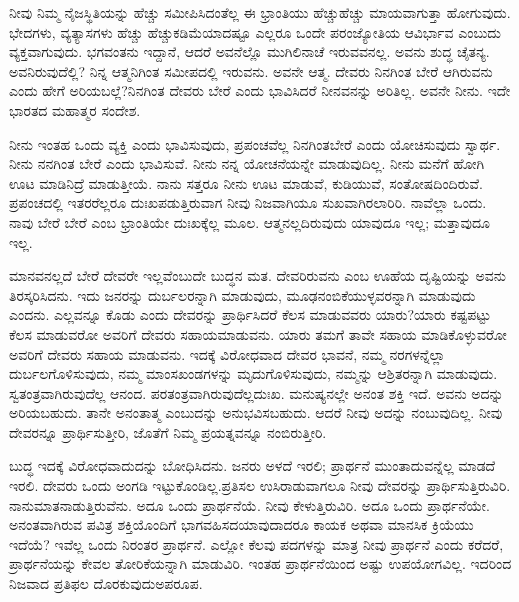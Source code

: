 \vskip 0.1cm

ನೀವು ನಿಮ್ಮ ನೈಜಸ್ಥಿತಿಯನ್ನು ಹೆಚ್ಚು ಸಮೀಪಿಸಿದಂತೆಲ್ಲ ಈ ಭ್ರಾಂತಿಯು ಹೆಚ್ಚು\break ಹೆಚ್ಚು ಮಾಯವಾಗುತ್ತಾ ಹೋಗುವುದು. ಭೇದಗಳು, ವ್ಯತ್ಯಾಸಗಳು ಹೆಚ್ಚು ಹೆಚ್ಚು\break ಕಡಿಮೆಯಾದಷ್ಟೂ ಎಲ್ಲರೂ ಒಂದೇ ಪರಂಜ್ಯೋತಿಯ ಆವಿರ್ಭಾವ ಎಂಬುದು ವ್ಯಕ್ತವಾಗುವುದು. ಭಗವಂತನು ಇದ್ದಾನೆ, ಆದರೆ ಅವನೆಲ್ಲೊ ಮುಗಿಲಿನಾಚೆ ಇರುವವನಲ್ಲ. ಅವನು ಶುದ್ಧ ಚೈತನ್ಯ. ಅವನಿರುವುದೆಲ್ಲಿ? ನಿನ್ನ ಆತ್ಮನಿಗಿಂತ ಸಮೀಪದಲ್ಲಿ ಇರುವನು. ಅವನೇ ಆತ್ಮ. ದೇವರು ನಿನಗಿಂತ ಬೇರೆ ಆಗಿರುವನು ಎಂದು ಹೇಗೆ ಅರಿಯಬಲ್ಲೆ?\break ನಿನಗಿಂತ ದೇವರು ಬೇರೆ ಎಂದು ಭಾವಿಸಿದರೆ ನೀನವನನ್ನು ಅರಿತಿಲ್ಲ. ಅವನೇ ನೀನು. ಇದೇ ಭಾರತದ ಮಹಾತ್ಮರ ಸಂದೇಶ.

\vskip 0.1cm

ನೀನು ಇಂತಹ ಒಂದು ವ್ಯಕ್ತಿ ಎಂದು ಭಾವಿಸುವುದು, ಪ್ರಪಂಚವೆಲ್ಲ ನಿನಗಿಂತ\break ಬೇರೆ ಎಂದು ಯೋಚಿಸುವುದು ಸ್ವಾರ್ಥ. ನೀನು ನನಗಿಂತ ಬೇರೆ ಎಂದು ಭಾವಿಸುವೆ. ನೀನು ನನ್ನ ಯೋಚನೆಯನ್ನೇ ಮಾಡುವುದಿಲ್ಲ. ನೀನು ಮನೆಗೆ ಹೋಗಿ ಊಟ ಮಾಡಿ\break ನಿದ್ರೆ ಮಾಡುತ್ತೀಯೆ. ನಾನು ಸತ್ತರೂ ನೀನು ಊಟ ಮಾಡುವೆ, ಕುಡಿಯುವೆ, ಸಂತೋಷದಿಂದಿರುವೆ. ಪ್ರಪಂಚದಲ್ಲಿ ಇತರರೆಲ್ಲರೂ ದುಃಖಪಡುತ್ತಿರುವಾಗ ನೀವು ನಿಜವಾಗಿಯೂ ಸುಖವಾಗಿರಲಾರಿರಿ. ನಾವೆಲ್ಲಾ ಒಂದು. ನಾವು ಬೇರೆ ಬೇರೆ ಎಂಬ ಭ್ರಾಂತಿಯೇ ದುಃಖಕ್ಕೆಲ್ಲ ಮೂಲ. ಆತ್ಮನಲ್ಲದಿರುವುದು ಯಾವುದೂ ಇಲ್ಲ; ಮತ್ತಾವುದೂ ಇಲ್ಲ.

\vskip 0.1cm

ಮಾನವನಲ್ಲದೆ ಬೇರೆ ದೇವರೇ ಇಲ್ಲವೆಂಬುದೇ ಬುದ್ಧನ ಮತ. ದೇವರಿರುವನು ಎಂಬ ಊಹೆಯ ದೃಷ್ಟಿಯನ್ನು ಅವನು ತಿರಸ್ಕರಿಸಿದನು. ಇದು ಜನರನ್ನು ದುರ್ಬಲರನ್ನಾಗಿ ಮಾಡುವುದು, ಮೂಢನಂಬಿಕೆಯುಳ್ಳವರನ್ನಾಗಿ ಮಾಡುವುದು ಎಂದನು. ಎಲ್ಲವನ್ನೂ ಕೊಡು ಎಂದು ದೇವರನ್ನು ಪ್ರಾರ್ಥಿಸಿದರೆ ಕೆಲಸ ಮಾಡುವವರು ಯಾರು?\break ಯಾರು ಕಷ್ಟಪಟ್ಟು ಕೆಲಸ ಮಾಡುವರೋ ಅವರಿಗೆ ದೇವರು ಸಹಾಯಮಾಡುವನು. ಯಾರು ತಮಗೆ ತಾವೇ ಸಹಾಯ ಮಾಡಿಕೊಳ್ಳುವರೋ ಅವರಿಗೆ ದೇವರು ಸಹಾಯ ಮಾಡುವನು. ಇದಕ್ಕೆ ವಿರೋಧವಾದ ದೇವರ ಭಾವನೆ, ನಮ್ಮ ನರಗಳನ್ನೆಲ್ಲಾ ದುರ್ಬಲಗೊಳಿಸುವುದು, ನಮ್ಮ ಮಾಂಸಖಂಡಗಳನ್ನು ಮೃದುಗೊಳಿಸುವುದು, ನಮ್ಮನ್ನು ಆಶ್ರಿತರನ್ನಾಗಿ ಮಾಡುವುದು. ಸ್ವತಂತ್ರವಾಗಿರುವುದೆಲ್ಲ ಆನಂದ. ಪರತಂತ್ರವಾಗಿರುವುದೆಲ್ಲ\break ದುಃಖ. ಮನುಷ್ಯನಲ್ಲೇ ಅನಂತ ಶಕ್ತಿ ಇದೆ. ಅವನು ಅದನ್ನು ಅರಿಯಬಹುದು. ತಾನೇ ಅನಂತಾತ್ಮ ಎಂಬುದನ್ನು ಅನುಭವಿಸಬಹುದು. ಆದರೆ ನೀವು ಅದನ್ನು ನಂಬುವುದಿಲ್ಲ. ನೀವು ದೇವರನ್ನೂ ಪ್ರಾರ್ಥಿಸುತ್ತೀರಿ, ಜೊತೆಗೆ ನಿಮ್ಮ ಪ್ರಯತ್ನವನ್ನೂ ನಂಬಿರುತ್ತೀರಿ.

\vskip 0.1cm

ಬುದ್ಧ ಇದಕ್ಕೆ ವಿರೋಧವಾದುದನ್ನು ಬೋಧಿಸಿದನು. ಜನರು ಅಳದೆ ಇರಲಿ; ಪ್ರಾರ್ಥನೆ ಮುಂತಾದುವನ್ನೆಲ್ಲ ಮಾಡದೆ ಇರಲಿ. ದೇವರು ಒಂದು ಅಂಗಡಿ ಇಟ್ಟುಕೊಂಡಿಲ್ಲ.\break ಪ್ರತಿಸಲ ಉಸಿರಾಡುವಾಗಲೂ ನೀವು ದೇವರನ್ನು ಪ್ರಾರ್ಥಿಸುತ್ತಿರುವಿರಿ. ನಾನು\break ಮಾತನಾಡುತ್ತಿರುವೆನು. ಅದೂ ಒಂದು ಪ್ರಾರ್ಥನೆಯೆ. ನೀವು ಕೇಳುತ್ತಿರುವಿರಿ. ಅದೂ ಒಂದು ಪ್ರಾರ್ಥನೆಯೇ. ಅನಂತವಾಗಿರುವ ಪವಿತ್ರ ಶಕ್ತಿಯೊಂದಿಗೆ ಭಾಗವಹಿಸದ\break ಯಾವುದಾದರೂ ಕಾಯಕ ಅಥವಾ ಮಾನಸಿಕ ಕ್ರಿಯೆಯು ಇದೆಯೆ? ಇವೆಲ್ಲ ಒಂದು ನಿರಂತರ ಪ್ರಾರ್ಥನೆ. ಎಲ್ಲೋ ಕೆಲವು ಪದಗಳನ್ನು ಮಾತ್ರ ನೀವು ಪ್ರಾರ್ಥನೆ ಎಂದು ಕರೆದರೆ, ಪ್ರಾರ್ಥನೆಯನ್ನು ಕೇವಲ ತೋರಿಕೆಯನ್ನಾಗಿ ಮಾಡುವಿರಿ. ಇಂತಹ ಪ್ರಾರ್ಥನೆಯಿಂದ ಅಷ್ಟು ಉಪಯೋಗವಿಲ್ಲ. ಇದರಿಂದ ನಿಜವಾದ ಪ್ರತಿಫಲ ದೊರಕುವುದು\break ಅಪರೂಪ.

